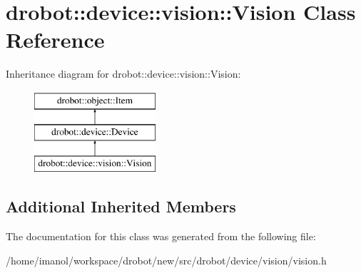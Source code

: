 \hypertarget{classdrobot_1_1device_1_1vision_1_1Vision}{\section{drobot\-:\-:device\-:\-:vision\-:\-:Vision Class Reference}
\label{classdrobot_1_1device_1_1vision_1_1Vision}
}
Inheritance diagram for drobot\-:\-:device\-:\-:vision\-:\-:Vision\-:\begin{figure}[H]
\begin{center}
\leavevmode
\includegraphics[height=3.000000cm]{classdrobot_1_1device_1_1vision_1_1Vision}
\end{center}
\end{figure}
\subsection*{Additional Inherited Members}


The documentation for this class was generated from the following file\-:\begin{DoxyCompactItemize}
\item 
/home/imanol/workspace/drobot/new/src/drobot/device/vision/vision.\-h\end{DoxyCompactItemize}
